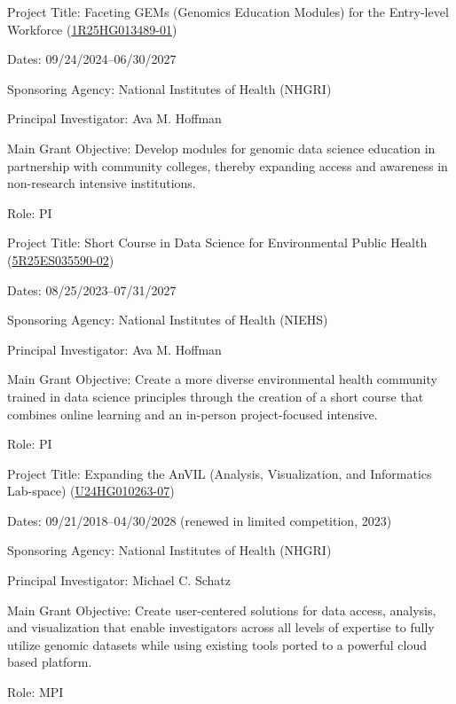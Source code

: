 \documentclass{cv}
\begin{document}
Project Title: Faceting GEMs (Genomics Education Modules) for the Entry-level Workforce (\href{https://reporter.nih.gov/search/pwbDP4bi2EGczoYgVimlTA/project-details/10854368}{1R25HG013489-01})

Dates: 09/24/2024--06/30/2027

Sponsoring Agency: National Institutes of Health (NHGRI)

Principal Investigator: Ava M. Hoffman

Main Grant Objective: Develop modules for genomic data science education in partnership with community colleges, thereby expanding access and awareness in non-research intensive institutions.

Role: PI

\vspace{5mm}

Project Title: Short Course in Data Science for Environmental Public Health (\href{https://reporter.nih.gov/search/n8pPuYzcskWEltb40MVBkA/project-details/10746327}{5R25ES035590-02})

Dates: 08/25/2023--07/31/2027

Sponsoring Agency: National Institutes of Health (NIEHS)

Principal Investigator: Ava M. Hoffman

Main Grant Objective: Create a more diverse environmental health community trained in data science principles through the creation of a short course that combines online learning and an in-person project-focused intensive.

Role: PI

\vspace{5mm}

Project Title: Expanding the AnVIL (Analysis, Visualization, and Informatics Lab-space) (\href{https://reporter.nih.gov/search/n8pPuYzcskWEltb40MVBkA/project-details/10748042}{U24HG010263-07})

Dates: 09/21/2018--04/30/2028 (renewed in limited competition, 2023)

Sponsoring Agency: National Institutes of Health (NHGRI)

Principal Investigator: Michael C. Schatz

Main Grant Objective: Create user-centered solutions for data access, analysis, and visualization that enable investigators across all levels of expertise to fully utilize genomic datasets while using existing tools ported to a powerful cloud based platform.

Role: MPI
\end{document}
